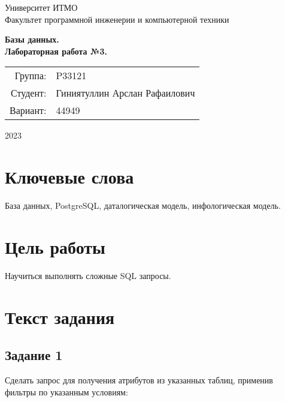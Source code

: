 \documentclass{article}
\begin{document}
\begin{titlepage}
    \begin{center}
        \begin{spacing}{1.4}
            \large{Университет ИТМО} \\
            \large{Факультет программной инженерии и компьютерной техники} \\
        \end{spacing}
        \vfill
        \textbf{
            \huge{Базы данных.} \\
            \huge{Лабораторная работа №3.} \\
        }
    \end{center}
    \vfill
    \begin{center}
        \begin{tabular}{r l}
            Группа:  & P33121                  \\
            Студент: & Гиниятуллин Арслан Рафаилович \\
            Вариант: & 44949
        \end{tabular}
    \end{center}
    \vfill
    \begin{center}
        \begin{large}
            2023
        \end{large}
    \end{center}
\end{titlepage}

\section*{Ключевые слова}

База данных, PostgreSQL,
даталогическая модель,
инфологическая модель.

\tableofcontents

\section{Цель работы}

Научиться выполнять сложные SQL
запросы.

\section{Текст задания}

\subsection{Задание 1}
Сделать запрос для получения атрибутов из указанных таблиц, применив фильтры по указанным условиям: \\ \\
\end{document}
